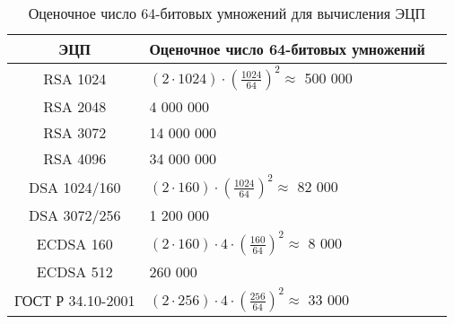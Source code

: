\begin{table}[h!]
    \centering
    \caption{Оценочное число 64-битовых умножений для вычисления ЭЦП\label{tab:signature-rate}}
    \begin{tabular}{|c|l|c|}
        \hline
        ЭЦП & Оценочное число 64-битовых умножений \\
        \hline \hline
        RSA 1024 & $(2 \cdot 1024) \cdot \left( \frac{1024}{64} \right)^2 \approx$ 500 000 \\
        RSA 2048 & 4 000 000 \\
        RSA 3072 & 14 000 000 \\
        RSA 4096 & 34 000 000 \\
        \hline \hline
        DSA 1024/160 & $(2 \cdot 160) \cdot \left( \frac{1024}{64} \right)^2 \approx$ 82 000 \\
        DSA 3072/256 & 1 200 000 \\
        \hline \hline
        ECDSA 160 & $(2 \cdot 160) \cdot 4 \cdot \left( \frac{160}{64} \right)^2 \approx$ 8 000 \\
        ECDSA 512 & 260 000 \\
        \hline \hline
        ГОСТ Р 34.10-2001 & $(2 \cdot 256) \cdot 4 \cdot \left( \frac{256}{64} \right)^2 \approx$ 33 000 \\
        \hline
    \end{tabular}
\end{table}
